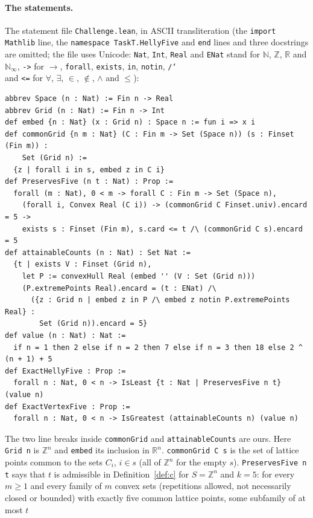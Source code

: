 \documentclass[11pt]{article}
\theoremstyle{definition}
\theoremstyle{remark}
\newcommand{\Z}{\mathbb Z}
\newcommand{\R}{\mathbb R}
\begin{document}
{\paragraph{The statements.} The statement file \texttt{Challenge.lean}, in
ASCII transliteration (the \texttt{import Mathlib} line, the
\texttt{namespace TaskT.HellyFive} and \texttt{end} lines and three docstrings
are omitted; the file uses Unicode: \texttt{Nat}, \texttt{Int}, \texttt{Real}
and \texttt{ENat} stand for $\mathbb N$, $\Z$, $\R$ and $\mathbb N_\infty$,
\texttt{->} for $\to$, \texttt{forall}, \texttt{exists}, \texttt{in},
\texttt{notin}, \texttt{/\char`\\} and \texttt{<=} for $\forall$, $\exists$,
$\in$, $\notin$, $\wedge$ and $\le$):
{\footnotesize
\begin{verbatim}
abbrev Space (n : Nat) := Fin n -> Real
abbrev Grid (n : Nat) := Fin n -> Int
def embed {n : Nat} (x : Grid n) : Space n := fun i => x i
def commonGrid {n m : Nat} (C : Fin m -> Set (Space n)) (s : Finset (Fin m)) :
    Set (Grid n) :=
  {z | forall i in s, embed z in C i}
def PreservesFive (n t : Nat) : Prop :=
  forall (m : Nat), 0 < m -> forall C : Fin m -> Set (Space n),
    (forall i, Convex Real (C i)) -> (commonGrid C Finset.univ).encard = 5 ->
    exists s : Finset (Fin m), s.card <= t /\ (commonGrid C s).encard = 5
def attainableCounts (n : Nat) : Set Nat :=
  {t | exists V : Finset (Grid n),
    let P := convexHull Real (embed '' (V : Set (Grid n)))
    (P.extremePoints Real).encard = (t : ENat) /\
      ({z : Grid n | embed z in P /\ embed z notin P.extremePoints Real} :
        Set (Grid n)).encard = 5}
def value (n : Nat) : Nat :=
  if n = 1 then 2 else if n = 2 then 7 else if n = 3 then 18 else 2 ^ (n + 1) + 5
def ExactHellyFive : Prop :=
  forall n : Nat, 0 < n -> IsLeast {t : Nat | PreservesFive n t} (value n)
def ExactVertexFive : Prop :=
  forall n : Nat, 0 < n -> IsGreatest (attainableCounts n) (value n)
\end{verbatim}}
\noindent The two line breaks inside \texttt{commonGrid} and
\texttt{attainableCounts} are ours. Here \texttt{Grid n} is $\Z^n$ and
\texttt{embed} its inclusion in $\R^n$. \texttt{commonGrid C s} is the set of
lattice points common to the sets $C_i$, $i\in s$ (all of $\Z^n$ for the empty
$s$). \texttt{PreservesFive n t} says that $t$ is admissible in
Definition~\ref{def:c} for $S=\Z^n$ and $k=5$: for every $m\ge1$ and every
family of $m$ convex sets (repetitions allowed, not necessarily closed or
bounded) with exactly five common lattice points, some subfamily of at most $t$
}
\end{document}
